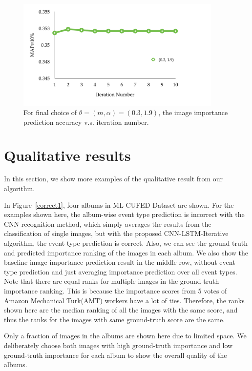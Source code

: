 \documentclass[runningheads]{llncs}
\begin{document}
\begin{figure}
\vspace{-0.1in}
\centering
\includegraphics[width=4in]{importance_iter}
\caption{For final choice of $\theta=(m, \alpha) = (0.3, 1.9)$, the image importance prediction accuracy v.s. iteration number.}
\label{importance_iter}
\vspace{-0.2in}
\end{figure}

\section{Qualitative results}
In this section, we show more examples of the qualitative result from our algorithm.

In Figure~\ref{correct1}, four albums in ML-CUFED Dataset are shown. For the examples shown here, the album-wise event type prediction is incorrect with the CNN recognition method, which simply averages the results from the classification of single images, but with the proposed CNN-LSTM-Iterative algorithm, the event type prediction is correct. Also, we can see the ground-truth and predicted importance ranking of the images in each album. We also show the baseline image importance prediction result in the middle row, without event type prediction and just averaging importance prediction over all event types. Note that there are equal ranks for multiple images in the ground-truth importance ranking. This is because the importance scores from 5 votes of Amazon Mechanical Turk(AMT) workers have a lot of ties. Therefore, the ranks shown here are the median ranking of all the images with the same score, and thus the ranks for the images with same ground-truth score are the same.

Only a fraction of images in the albums are shown here due to limited space. We deliberately choose both images with high ground-truth importance and low ground-truth importance for each album to show the overall quality of the albums.
\end{document}
